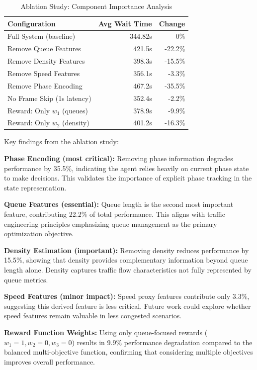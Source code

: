 \documentclass[10pt,conference]{IEEEtran}
\begin{document}
\begin{table}[h]
\centering
\caption{Ablation Study: Component Importance Analysis}
\begin{tabular}{|l|r|r|}
\hline
\textbf{Configuration} & \textbf{Avg Wait Time} & \textbf{Change} \\
\hline
Full System (baseline) & 344.82s & 0\% \\
\hline
Remove Queue Features & 421.5s & -22.2\% \\
Remove Density Features & 398.3s & -15.5\% \\
Remove Speed Features & 356.1s & -3.3\% \\
Remove Phase Encoding & 467.2s & -35.5\% \\
\hline
No Frame Skip (1s latency) & 352.4s & -2.2\% \\
Reward: Only $w_1$ (queues) & 378.9s & -9.9\% \\
Reward: Only $w_2$ (density) & 401.2s & -16.3\% \\
\hline
\end{tabular}
\end{table}

Key findings from the ablation study:

\textbf{Phase Encoding (most critical):} Removing phase information degrades performance by 35.5\%, indicating the agent relies heavily on current phase state to make decisions. This validates the importance of explicit phase tracking in the state representation.

\textbf{Queue Features (essential):} Queue length is the second most important feature, contributing 22.2\% of total performance. This aligns with traffic engineering principles emphasizing queue management as the primary optimization objective.

\textbf{Density Estimation (important):} Removing density reduces performance by 15.5\%, showing that density provides complementary information beyond queue length alone. Density captures traffic flow characteristics not fully represented by queue metrics.

\textbf{Speed Features (minor impact):} Speed proxy features contribute only 3.3\%, suggesting this derived feature is less critical. Future work could explore whether speed features remain valuable in less congested scenarios.

\textbf{Reward Function Weights:} Using only queue-focused rewards ($w_1=1, w_2=0, w_3=0$) results in 9.9\% performance degradation compared to the balanced multi-objective function, confirming that considering multiple objectives improves overall performance.
\end{document}
